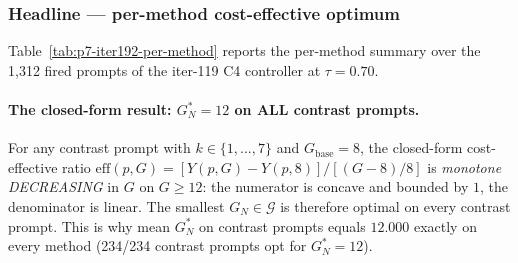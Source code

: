 \subsubsection*{Headline --- per-method cost-effective optimum}

Table~\ref{tab:p7-iter192-per-method} reports the per-method summary
over the 1,312 fired prompts of the iter-119 C4 controller at
$\tau = 0.70$.

\begin{table}[ht]
\centering
\small
{}
\caption{Per-method per-prompt cost-effective optimum on the 1,312
fired prompts of the iter-119 C4 controller at $\tau = 0.70$ on the
N2 four-method $\times$ 40-step panel. ``$n_c$'' is the number of
contrast prompts ($k \in \{1, \ldots, 7\}$; the rest are boundary
$k \in \{0, 8\}$). ``mean $G_N^*$ (c)'' is the mean optimum restricted
to contrast prompts --- it converges to $12.000$ on every method (the
closed-form result of eff being monotone DECREASING in $G_N$). Savings
frac $= (16 - \overline{G_N^*}) / 16$, bootstrap 95\% CI
($B=2000$, seed=20260706). The cross-method CV on savings frac is
$0.92\%$.}
\label{tab:p7-iter192-per-method}
\end{table}

\paragraph{The closed-form result: $G_N^* = 12$ on ALL contrast prompts.}

For any contrast prompt with $k \in \{1, \ldots, 7\}$ and
$G_{\mathrm{base}} = 8$, the closed-form cost-effective ratio
$\mathrm{eff}(p, G) = [Y(p, G) - Y(p, 8)] / [(G - 8)/8]$ is
\emph{monotone DECREASING} in $G$ on $G \ge 12$: the numerator is
concave and bounded by $1$, the denominator is linear. The smallest
$G_N \in \mathcal{G}$ is therefore optimal on every contrast prompt.
This is why mean $G_N^*$ on contrast prompts equals $12.000$ exactly
on every method (234/234 contrast prompts opt for $G_N^* = 12$).

